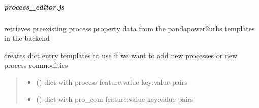 \documentclass[letterpaper,10pt,english]{sphinxmanual}
\begin{document}
\sphinxstepscope


\subparagraph{process\_editor.js}
\label{\detokenize{docs_gui/js_api/urbs_editor/process_editor:process-editor-js}}\label{\detokenize{docs_gui/js_api/urbs_editor/process_editor::doc}}

\begin{fulllineitems}
\label{\detokenize{docs_gui/js_api/urbs_editor/process_editor:fetchProcessProfiles}}
\pysigstartsignatures
{}
\pysigstopsignatures
\sphinxAtStartPar
retrieves pre\sphinxhyphen{}existing process property data from the pandapower2urbs templates in the backend

\end{fulllineitems}


\begin{fulllineitems}
\label{\detokenize{docs_gui/js_api/urbs_editor/process_editor:createProcessJSONTemplates}}
\pysigstartsignatures
{}
\pysigstopsignatures
\sphinxAtStartPar
creates dict entry templates to use if we want to add new processes or new process commodities
\begin{quote}\begin{description}
\begin{itemize}
\item {} 
\sphinxAtStartPar
{} () \textendash{} dict with process feature:value key:value pairs

\item {} 
\sphinxAtStartPar
{} () \textendash{} dict with pro\_com feature:value key:value pairs

\end{itemize}

\end{description}\end{quote}

\end{fulllineitems}
\end{document}
